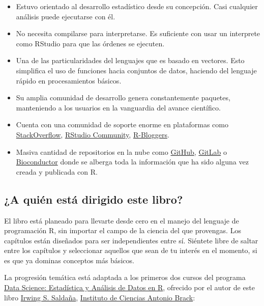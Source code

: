 \documentclass[
]{article}
\theoremstyle{definition}
\theoremstyle{definition}
\theoremstyle{definition}
\theoremstyle{definition}
\theoremstyle{remark}
\begin{document}
\begin{itemize}
\item
  Estuvo orientado al desarrollo estadístico desde su concepción. Casi cualquier análisis puede ejecutarse con él.
\item
  No necesita compilarse para interpretarse. Es suficiente con usar un interprete como RStudio para que las órdenes se ejecuten.
\item
  Una de las particularidades del lenguajes que es basado en vectores. Esto simplifica el uso de funciones hacia conjuntos de datos, haciendo del lenguaje rápido en procesamientos básicos.
\item
  Su amplia comunidad de desarrollo genera constantemente paquetes, manteniendo a los usuarios en la vanguardia del avance científico.
\item
  Cuenta con una comunidad de soporte enorme en plataformas como \href{https://stackoverflow.com/}{StackOverflow}, \href{https://community.rstudio.com/}{RStudio Community}, \href{https://www.r-bloggers.com/}{R-Bloggers}.
\item
  Masiva cantidad de repositorios en la nube como \href{https://github.com/}{GitHub}, \href{https://gitlab.com/}{GitLab} o \href{https://www.bioconductor.org/}{Bioconductor} donde se alberga toda la información que ha sido alguna vez creada y publicada con R.
\end{itemize}

\hypertarget{a-quiuxe9n-estuxe1-dirigido-este-libro}{%
\subsection*{¿A quién está dirigido este libro?}\label{a-quiuxe9n-estuxe1-dirigido-este-libro}}

El libro está planeado para llevarte desde cero en el manejo del lenguaje de programación R, sin importar el campo de la ciencia del que provengas. Los capítulos están diseñados para ser independientes entre sí. Siéntete libre de saltar entre los capítulos y seleccionar aquellos que sean de tu interés en el momento, si es que ya dominas conceptos más básicos.

La progresión temática está adaptada a los primeros dos cursos del programa \href{https://www.masterx.org/bundles/estadisticar}{Data Science: Estadística y Análisis de Datos en R}, ofrecido por el autor de este libro \href{https://github.com/irwingss}{Irwing S. Saldaña}, \href{https://www.brackinstitute.com/}{Instituto de Ciencias Antonio Brack}:
\end{document}
